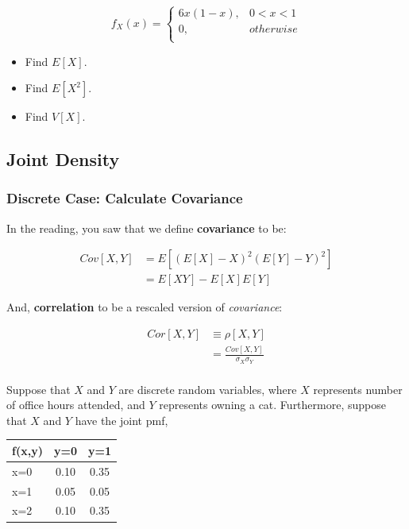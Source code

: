 \documentclass[
  letterpaper,
  DIV=11,
  numbers=noendperiod]{scrreprt}
\providecommand{\tightlist}{%
  \setlength{\itemsep}{0pt}\setlength{\parskip}{0pt}}\usepackage{longtable,booktabs,array}
\begin{document}
\[
  f_{X}(x) = \begin{cases} 
    6x(1 - x), & 0 < x < 1 \\ 
    0, & otherwise \\ 
  \end{cases}
\]

\begin{itemize}
\tightlist
\item
  Find \(E[X]\).
\item
  Find \(E[X^2]\).
\item
  Find \(V[X]\).
\end{itemize}

\subsection{Joint Density}\label{joint-density-1}

\subsubsection{Discrete Case: Calculate
Covariance}\label{discrete-case-calculate-covariance}

In the reading, you saw that we define \textbf{covariance} to be:

\[
\begin{aligned}
Cov[X,Y]    &= E[(E[X] - X)^{2}(E[Y] - Y)^{2}] \\ 
            &= E[XY] - E[X]E[Y]
\end{aligned} 
\]

And, \textbf{correlation} to be a rescaled version of \emph{covariance}:

\[
\begin{aligned}
Cor[X,Y]    & \equiv \rho[X,Y] \\ 
            & = \frac{Cov[X,Y]}{\sigma_{X}\sigma_{Y}} \\
\end{aligned}            
\]

Suppose that \(X\) and \(Y\) are discrete random variables, where \(X\)
represents number of office hours attended, and \(Y\) represents owning
a cat. Furthermore, suppose that \(X\) and \(Y\) have the joint pmf,

\begin{longtable}[]{@{}lcc@{}}
\toprule\noalign{}
f(x,y) & y=0 & y=1 \\
\midrule\noalign{}
\endhead
\bottomrule\noalign{}
\endlastfoot
x=0 & 0.10 & 0.35 \\
x=1 & 0.05 & 0.05 \\
x=2 & 0.10 & 0.35 \\
\end{longtable}
\end{document}
